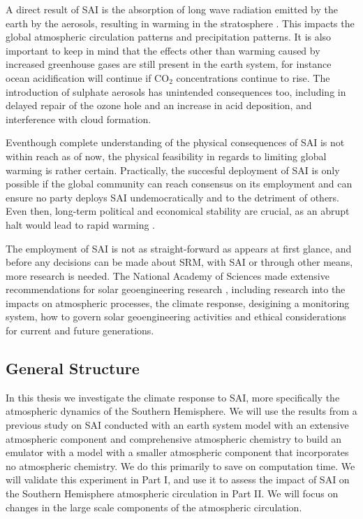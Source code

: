 A direct result of SAI is the absorption of long wave radiation emitted by the earth by the aerosols, resulting in warming in the stratosphere \parencite{Ammann2010}. This impacts the global atmospheric circulation patterns and precipitation patterns. It is also important to keep in mind that the effects other than warming caused by increased greenhouse gases are still present in the earth system, for instance ocean acidification will continue if CO$_2$ concentrations continue to rise. The introduction of sulphate aerosols has unintended consequences too, including in delayed repair of the ozone hole and an increase in acid deposition, and interference with cloud formation. 

Eventhough complete understanding of the physical consequences of SAI is not within reach as of now, the physical feasibility in regards to limiting global warming is rather certain. Practically, the succesful deployment of SAI is only possible if the global community can reach consensus on its employment and can ensure no party deploys SAI undemocratically and to the detriment of others. Even then, long-term political and economical stability are crucial, as an abrupt halt would lead to rapid warming \parencite{robock2009}. 

The employment of SAI is not as straight-forward as appears at first glance, and before any decisions can be made about SRM, with SAI or through other means, more research is needed. The National Academy of Sciences made extensive recommendations for solar geoengineering research \parencite{reflecting}, including research into the impacts on atmospheric processes, the climate response, desigining a monitoring system, how to govern solar geoengineering activities and ethical considerations for current and future generations. 

\subsection{General Structure}
In this thesis we investigate the climate response to SAI, more specifically the atmospheric dynamics of the Southern Hemisphere. We will use the results from a previous study on SAI conducted with an earth system model with an extensive atmospheric component and comprehensive atmospheric chemistry to build an emulator with a model with a smaller atmospheric component that incorporates no atmospheric chemistry. We do this primarily to save on computation time. We will validate this experiment in Part I, and use it to assess the impact of SAI on the Southern Hemisphere atmospheric circulation in Part II. We will focus on changes in the large scale components of the atmospheric circulation. 

